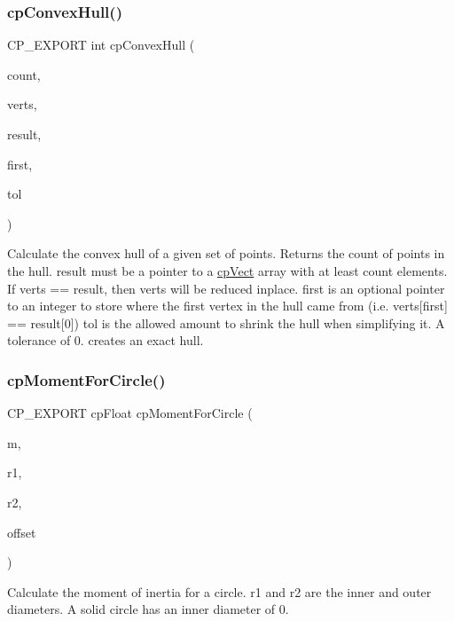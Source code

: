 \subsubsection{\texorpdfstring{cp\+Convex\+Hull()}{cpConvexHull()}}
{\footnotesize\ttfamily C\+P\+\_\+\+E\+X\+P\+O\+RT int cp\+Convex\+Hull (\begin{DoxyParamCaption}\item[{int}]{count,  }\item[{const \hyperlink{structcpVect}{cp\+Vect} $\ast$}]{verts,  }\item[{\hyperlink{structcpVect}{cp\+Vect} $\ast$}]{result,  }\item[{int $\ast$}]{first,  }\item[{cp\+Float}]{tol }\end{DoxyParamCaption})}

Calculate the convex hull of a given set of points. Returns the count of points in the hull. {\ttfamily result} must be a pointer to a {\ttfamily \hyperlink{structcpVect}{cp\+Vect}} array with at least {\ttfamily count} elements. If {\ttfamily verts} == {\ttfamily result}, then {\ttfamily verts} will be reduced inplace. {\ttfamily first} is an optional pointer to an integer to store where the first vertex in the hull came from (i.\+e. verts\mbox{[}first\mbox{]} == result\mbox{[}0\mbox{]}) {\ttfamily tol} is the allowed amount to shrink the hull when simplifying it. A tolerance of 0. creates an exact hull. \mbox{\label{group__misc_gafa2103fb2fd788fded1131e53f00681a}} 
\subsubsection{\texorpdfstring{cp\+Moment\+For\+Circle()}{cpMomentForCircle()}}
{\footnotesize\ttfamily C\+P\+\_\+\+E\+X\+P\+O\+RT cp\+Float cp\+Moment\+For\+Circle (\begin{DoxyParamCaption}\item[{cp\+Float}]{m,  }\item[{cp\+Float}]{r1,  }\item[{cp\+Float}]{r2,  }\item[{\hyperlink{structcpVect}{cp\+Vect}}]{offset }\end{DoxyParamCaption})}

Calculate the moment of inertia for a circle. {\ttfamily r1} and {\ttfamily r2} are the inner and outer diameters. A solid circle has an inner diameter of 0. \mbox{\label{group__misc_ga9548fe7830d426bde625d39d4687e6be}} 
